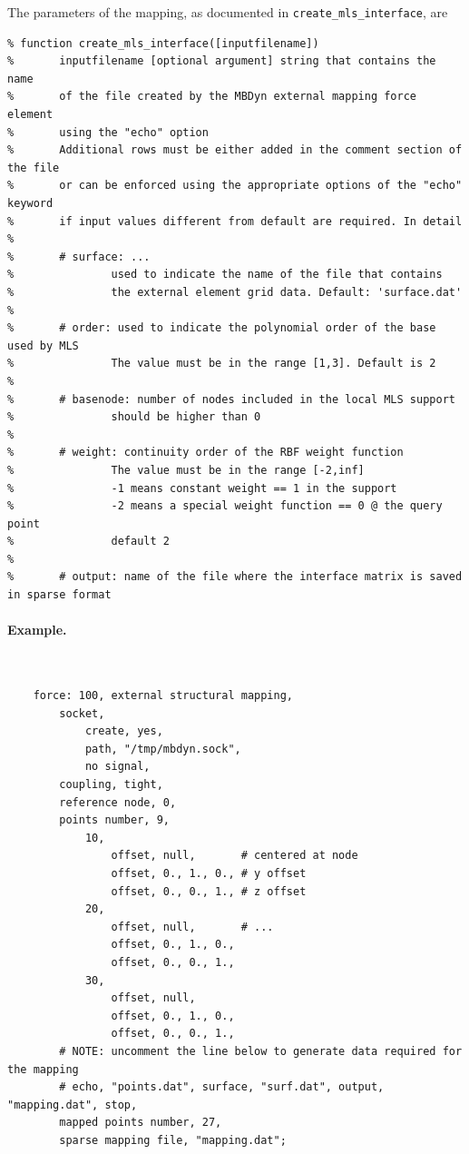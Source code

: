 The parameters of the mapping, as documented in
\texttt{create\_mls\_interface}, are
\begin{verbatim}
% function create_mls_interface([inputfilename])
%       inputfilename [optional argument] string that contains the name
%       of the file created by the MBDyn external mapping force element 
%       using the "echo" option
%       Additional rows must be either added in the comment section of the file
%       or can be enforced using the appropriate options of the "echo" keyword
%       if input values different from default are required. In detail
%
%       # surface: ...
%               used to indicate the name of the file that contains 
%               the external element grid data. Default: 'surface.dat' 
%
%       # order: used to indicate the polynomial order of the base used by MLS
%               The value must be in the range [1,3]. Default is 2
%
%       # basenode: number of nodes included in the local MLS support
%               should be higher than 0
%
%       # weight: continuity order of the RBF weight function
%               The value must be in the range [-2,inf]
%               -1 means constant weight == 1 in the support
%               -2 means a special weight function == 0 @ the query point 
%               default 2
%
%       # output: name of the file where the interface matrix is saved in sparse format
\end{verbatim}



\paragraph{Example.} \
\begin{verbatim}
    force: 100, external structural mapping,
        socket,
            create, yes,
            path, "/tmp/mbdyn.sock",
            no signal,
        coupling, tight,
        reference node, 0,
        points number, 9,
            10,
                offset, null,       # centered at node
                offset, 0., 1., 0., # y offset
                offset, 0., 0., 1., # z offset
            20,
                offset, null,       # ...
                offset, 0., 1., 0.,
                offset, 0., 0., 1.,
            30,
                offset, null,
                offset, 0., 1., 0.,
                offset, 0., 0., 1.,
        # NOTE: uncomment the line below to generate data required for the mapping
        # echo, "points.dat", surface, "surf.dat", output, "mapping.dat", stop,
        mapped points number, 27,
        sparse mapping file, "mapping.dat";
\end{verbatim}

